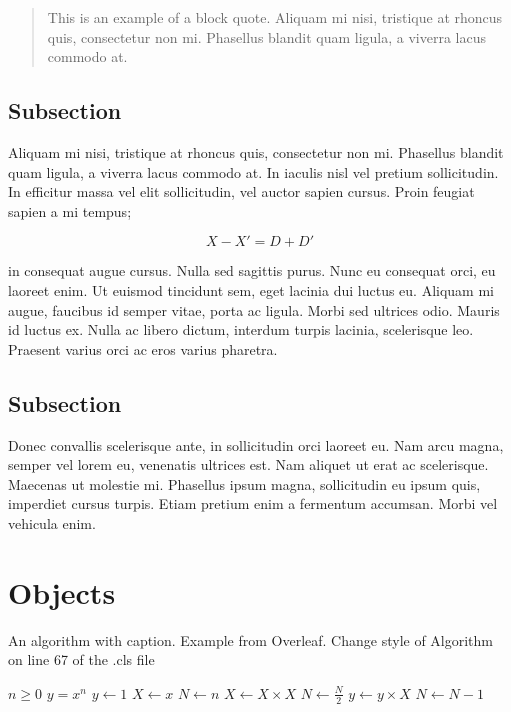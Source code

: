 \begin{quote}
    \begin{singlespace}
  This is an example of a block quote. Aliquam mi nisi, tristique at rhoncus quis, consectetur non mi. Phasellus blandit quam ligula, a viverra lacus commodo at. 
    \end{singlespace}
    
\end{quote}

\subsection{Subsection}

Aliquam mi nisi, tristique at rhoncus quis, consectetur non mi. Phasellus blandit quam ligula, a viverra lacus commodo at. In iaculis nisl vel pretium sollicitudin. In efficitur massa vel elit sollicitudin, vel auctor sapien cursus. Proin feugiat sapien a mi tempus;

\begin{equation}
    X-X'=D+D'
\end{equation}
 
 
\noindent in consequat augue cursus. Nulla sed sagittis purus. Nunc eu consequat orci, eu laoreet enim. Ut euismod tincidunt sem, eget lacinia dui luctus eu. Aliquam mi augue, faucibus id semper vitae, porta ac ligula. Morbi sed ultrices odio. Mauris id luctus ex. Nulla ac libero dictum, interdum turpis lacinia, scelerisque leo. Praesent varius orci ac eros varius pharetra.


\subsection{Subsection}
Donec convallis scelerisque ante, in sollicitudin orci laoreet eu. Nam arcu magna, semper vel lorem eu, venenatis ultrices est. Nam aliquet ut erat ac scelerisque. Maecenas ut molestie mi. Phasellus ipsum magna, sollicitudin eu ipsum quis, imperdiet cursus turpis. Etiam pretium enim a fermentum accumsan. Morbi vel vehicula enim.

\section{Objects}

\begin{algorithm}
\caption[An algorithm with caption]{An algorithm with caption. Example from Overleaf. Change style of Algorithm on line 67 of the .cls file}\label{alg:cap}
\begin{algorithmic}
\Require $n \geq 0$
\Ensure $y = x^n$
\State $y \gets 1$
\State $X \gets x$
\State $N \gets n$
    \State $X \gets X \times X$
    \State $N \gets \frac{N}{2}$  
    \State $y \gets y \times X$
    \State $N \gets N - 1$
\EndIf
\EndWhile
\end{algorithmic}
\end{algorithm}

